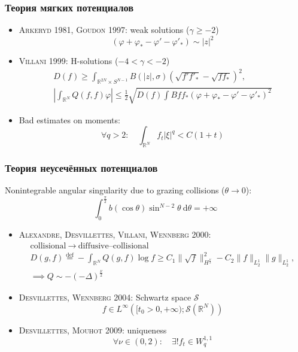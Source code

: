 \documentclass[mathserif]{beamer} %
\newcommand{\eqdef}{\overset{\mathrm{def}}{=}}
\newcommand{\dd}{\:\mathrm{d}}
\newcommand{\Cite}[2][]{\alert{\textsc{#2 #1}}}
\begin{document}
\begin{frame}
    \frametitle{Теория мягких потенциалов}
    \begin{itemize}
        \item \Cite[1981]{Arkeryd}, \Cite[1997]{Goudon}: weak solutions (\(\gamma\geq-2\))
        \[ (\varphi + \varphi_* - \varphi' - \varphi'_*) \sim |z|^2 \]
        \item \Cite[1999]{Villani}: H-solutions (\(-4<\gamma<-2\))
        \begin{gather*}
            D(f) \geq \int_{\mathbb{R}^{2N}\times S^{N-1}} B(|z|, \sigma) \left(\sqrt{f'f'_*} - \sqrt{ff_*}\right)^2, \\
            \left| \int_{\mathbb{R}^N} Q(f,f)\varphi \right| \leq \frac12
            \sqrt{ D(f) \int Bff_* (\varphi + \varphi_* - \varphi' - \varphi'_*)^2 }
        \end{gather*}
        \item Bad estimates on moments:
        \[ \forall q>2: \quad\int_{\mathbb{R}^N} f_t |\xi|^q < C(1+t) \]
    \end{itemize}
\end{frame}

\begin{frame}
    \frametitle{Теория неусечённых потенциалов}
    Nonintegrable angular singularity due to grazing collisions (\(\theta\to0\)):
    \[ \int_0^{\frac\pi2} b(\cos\theta)\sin^{N-2}\theta\dd\theta = +\infty \]
    \vspace{-20pt}
    \begin{itemize}
        \item \Cite[2000]{Alexandre, Desvillettes, Villani, Wennberg}:
        \begin{gather*}
            \text{collisional} \:\longrightarrow\: \text{diffusive--collisional} \\
            D(g,f) \eqdef -\int_{\mathbb{R}^N} Q(g,f)\log{f} \geq C_1\|\sqrt{f}\|^2_{H^\frac\nu2} - C_2\|f\|_{L^1_2}\|g\|_{L^1_2}, \\
            \implies Q \sim -(-\Delta)^\frac\nu2
        \end{gather*}
        \item \Cite[2004]{Desvillettes, Wennberg}: Schwartz space \(\mathscr{S}\)
        \[ f \in L^\infty\left([t_0>0,+\infty); \mathscr{S}(\mathbb{R}^N)\right) \]
        \item \Cite[2009]{Desvillettes, Mouhot}: uniqueness
        \[ \forall\nu\in(0,2): \quad\exists! f_t\in W_q^{1,1} \]
    \end{itemize}
\end{frame}
\end{document}
